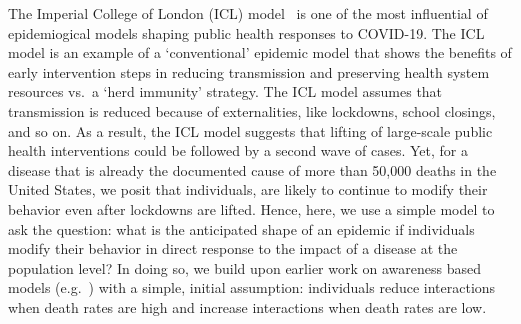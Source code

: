 The Imperial College of London (ICL) model~\citep{ferguson2020report} is
one of the most influential of 
epidemiogical models shaping public health responses to COVID-19. The ICL model is an
example of a `conventional' epidemic model
that shows the benefits of  early intervention steps in reducing
transmission and preserving health system resources vs.~a `herd immunity' strategy.  
The ICL model assumes that
transmission is reduced because of externalities, like lockdowns,
school closings, and so on.  
As a result, the ICL model suggests that lifting of large-scale
public health interventions could be followed by a second wave of cases.
Yet, for a disease
that is already the documented cause of more than 50,000 deaths
in the United States, we posit that individuals, 
are likely to continue to modify
their behavior even after lockdowns are lifted.  
Hence, here, we use a simple model to
ask the question: what is the anticipated
shape of an epidemic if individuals modify their behavior in direct
response to the impact of a disease at the population level? In doing so,
we build upon earlier work on awareness based models (e.g.~\citep{funk2009spread,funk2010modelling,eksin2017disease, eksin2019systematic}) with a
simple, initial assumption: individuals reduce interactions when 
death rates are high and increase interactions when death rates are low.  


